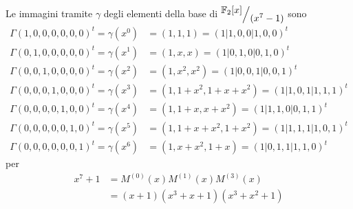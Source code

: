 \documentclass[mathserif]{beamer}
\def\quotient#1#2{%
   \raise1ex\hbox{$#1$}\Big/\lower1ex\hbox{$#2$}%
}
\begin{document}
\thispagestyle{empty}
\begin{frame}
   \vspace{-1.2cm}
    Le immagini tramite $\gamma$ degli elementi della base di $ \quotient{\mathbb{F}_{2} \lbrack x \rbrack  }{ (x^{7} - 1)}$ sono
    \begin{align*}   
	\Gamma(1,0,0,0,0,0,0)^{t}  = \gamma(x^0) &= (1,1,1) =  (1|1,0,0|1,0,0)^{t}           \\
	\Gamma(0,1,0,0,0,0,0)^{t}  = \gamma(x^1) &= (1,x,x) = (1|0,1,0|0,1,0)^{t}            \\
	\Gamma(0,0,1,0,0,0,0)^{t}  = \gamma(x^2) &= (1,x^2,x^2) = (1|0,0,1|0,0,1)^{t}        \\
	\Gamma(0,0,0,1,0,0,0)^{t}  = \gamma(x^3) &= (1,1+x^2,1+x+x^2) = (1|1,0,1|1,1,1)^{t}  \\
	\Gamma(0,0,0,0,1,0,0)^{t}  = \gamma(x^4) &= (1,1+x,x+x^2) = (1|1,1,0|0,1,1)^{t}      \\
	\Gamma(0,0,0,0,0,1,0)^{t}  = \gamma(x^5) &= (1,1+x+x^2,1+x^2) = (1|1,1,1|1,0,1)^{t}  \\
	\Gamma(0,0,0,0,0,0,1)^{t}  = \gamma(x^6) &= (1,x+x^2,1+x) = (1|0,1,1|1,1,0)^{t} 
    \end{align*}
    per 
    \begin{align*}
      x^{7} + 1 &= M^{(0)}(x) M^{(1)}(x) M^{(3)}(x) \\
		&= (x+1)(x^3 + x + 1)(x^3 + x^2 + 1) 
    \end{align*}
\end{frame}
\end{document}
